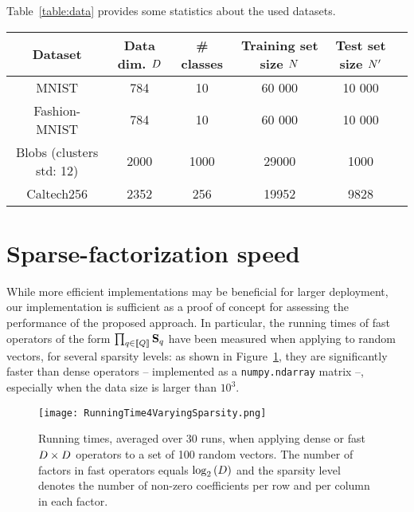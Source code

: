 Table~\ref{table:data} provides some statistics about the used datasets.

\begin{table*}[!h]
\centering
\begin{tabular}{|c|c|c|c|c|c|}
\hline
\textbf{Dataset} & \textbf{Data dim.} $D$        & \textbf{\# classes} & \textbf{Training set size} $N$ & \textbf{Test set size} $N'$ \\ \hline
MNIST                   & 784   & 10        & 60 000    & 10 000               \\ \hline
Fashion-MNIST           & 784   & 10        & 60 000    & 10 000               \\ \hline
Blobs (clusters std: 12)   & 2000  & 1000      & 29000      & 1000               \\ \hline
Caltech256              & 2352  & 256      & 19952      & 9828               \\ \hline
\end{tabular}
\caption{Datasets statistics}
\label{table:data}
\end{table*}

\section{Sparse-factorization speed}
\label{seq:sparse_factor_benchmarking}
While more efficient implementations may be beneficial for larger deployment, our implementation is sufficient as a proof of concept for assessing the performance of the proposed approach. 
In particular, the running times of fast operators of the form $\prod_{q\in\left \llbracket Q\right \rrbracket}{{\mathbf{S}}_q}$ have been measured when applying to random vectors, for several sparsity levels: 
as shown in Figure~\ref{fig:time_csr}, they are significantly faster than dense operators -- implemented as a \texttt{numpy.ndarray} matrix --, especially when the data size is larger than $10^3$.
\begin{figure}[tbh]
\centering
\texttt{[image: RunningTime4VaryingSparsity.png]}
\caption{Running times, averaged over 30 runs, when applying dense or fast $D \times D$ operators to a set of 100 random vectors. The number of factors in fast operators equals $\log_2\left (D\right )$ and the sparsity level denotes the number of non-zero coefficients per row and per column in each factor.}
\label{fig:time_csr}
\end{figure}

